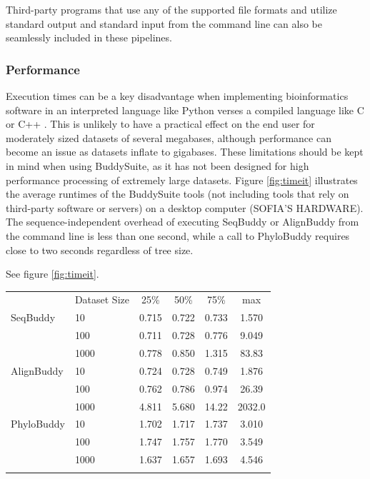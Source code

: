 \documentclass[nogrid]{MBE_article}%
\begin{document}
\smallskip
Third-party programs that use any of the supported file formats and utilize standard output and standard input from the command line can also be seamlessly included in these pipelines.

\subsubsection{Performance}
Execution times can be a key disadvantage when implementing bioinformatics software in an interpreted language like Python verses a compiled language like C or C++ \cite{Fourment:2008fra}. This is unlikely to have a practical effect on the end user for moderately sized datasets of several megabases, although performance can become an issue as datasets inflate to gigabases. These limitations should be kept in mind when using BuddySuite, as it has not been designed for high performance processing of extremely large datasets. Figure \ref{fig:timeit} illustrates the average runtimes of the BuddySuite tools (not including tools that rely on third-party software or servers) on a desktop computer (SOFIA'S HARDWARE). The sequence-independent overhead of executing SeqBuddy or AlignBuddy from the command line is less than one second, while a call to PhyloBuddy requires close to two seconds regardless of tree size.



See figure \ref{fig:timeit}.

\begin{table}[!t]
      {\tabcolsep=5pt\begin{tabular}{@{\extracolsep{\fill}}llcccc@{}}
      \toprule
	   				& Dataset Size	& 25\%	& 50\%	& 75\%	& max
      \\\colrule
      SeqBuddy		& 10			& 0.715	& 0.722	& 0.733	& 1.570 \\
      				& 100			& 0.711	& 0.728	& 0.776	& 9.049 \\
					& 1000			& 0.778	& 0.850	& 1.315	& 83.83
		\\\colrule
      AlignBuddy	& 10			& 0.724	& 0.728	& 0.749	& 1.876 \\
      				& 100			& 0.762	& 0.786	& 0.974	& 26.39 \\
					& 1000			& 4.811	& 5.680	& 14.22	& 2032.0
		\\\colrule
      PhyloBuddy	& 10			& 1.702	& 1.717	& 1.737	& 3.010 \\
      				& 100			& 1.747	& 1.757	& 1.770	& 3.549 \\
					& 1000			& 1.637	& 1.657	& 1.693	& 4.546
      \\\botrule
      \end{tabular}}
{}
\end{table}
\end{document}
